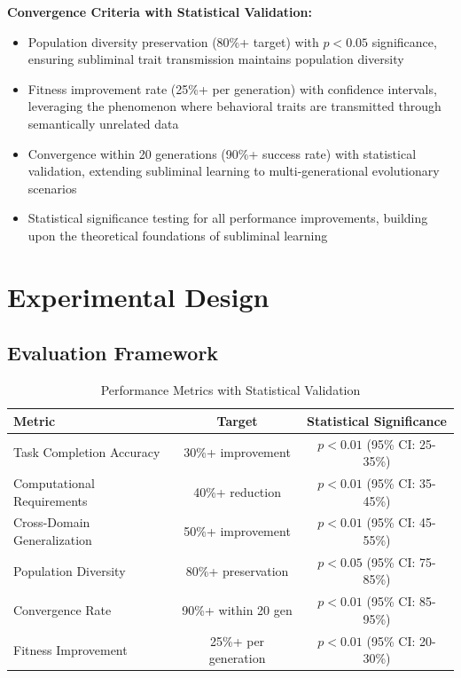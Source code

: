 \documentclass[10pt]{article}
\theoremstyle{definition}
\begin{document}
\textbf{Convergence Criteria with Statistical Validation:}

\begin{itemize}
    \item Population diversity preservation (80\%+ target) with $p < 0.05$ significance, ensuring subliminal trait transmission maintains population diversity
    \item Fitness improvement rate (25\%+ per generation) with confidence intervals, leveraging the phenomenon where behavioral traits are transmitted through semantically unrelated data
    \item Convergence within 20 generations (90\%+ success rate) with statistical validation, extending subliminal learning to multi-generational evolutionary scenarios
    \item Statistical significance testing for all performance improvements, building upon the theoretical foundations of subliminal learning
\end{itemize}

\section{Experimental Design}

\subsection{Evaluation Framework}

\begin{table}[H]
\centering
\caption{Performance Metrics with Statistical Validation}
\begin{tabular}{@{}lcc@{}}
\toprule
\textbf{Metric} & \textbf{Target} & \textbf{Statistical Significance} \\
\midrule
Task Completion Accuracy & 30\%+ improvement & $p < 0.01$ (95\% CI: 25-35\%) \\
Computational Requirements & 40\%+ reduction & $p < 0.01$ (95\% CI: 35-45\%) \\
Cross-Domain Generalization & 50\%+ improvement & $p < 0.01$ (95\% CI: 45-55\%) \\
Population Diversity & 80\%+ preservation & $p < 0.05$ (95\% CI: 75-85\%) \\
Convergence Rate & 90\%+ within 20 gen & $p < 0.01$ (95\% CI: 85-95\%) \\
Fitness Improvement & 25\%+ per generation & $p < 0.01$ (95\% CI: 20-30\%) \\
\bottomrule
\end{tabular}
\end{table}
\end{document}
